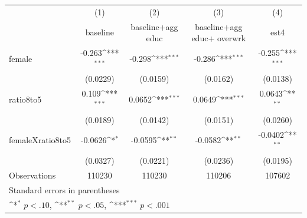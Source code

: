 {
\def\sym#1{\ifmmode^{#1}\else\(^{#1}\)\fi}
\begin{tabular}{l*{4}{c}}
\hline\hline
                    &\multicolumn{1}{c}{(1)}&\multicolumn{1}{c}{(2)}&\multicolumn{1}{c}{(3)}&\multicolumn{1}{c}{(4)}\\
                    &\multicolumn{1}{c}{baseline }&\multicolumn{1}{c}{baseline+agg educ}&\multicolumn{1}{c}{baseline+agg educ+ overwrk}&\multicolumn{1}{c}{est4}\\
\hline
female              &      -0.263\sym{***}&      -0.298\sym{***}&      -0.286\sym{***}&      -0.255\sym{***}\\
                    &    (0.0229)         &    (0.0159)         &    (0.0162)         &    (0.0138)         \\
[1em]
ratio8to5           &       0.109\sym{***}&      0.0652\sym{***}&      0.0649\sym{***}&      0.0643\sym{**} \\
                    &    (0.0189)         &    (0.0142)         &    (0.0151)         &    (0.0260)         \\
[1em]
femaleXratio8to5    &     -0.0626\sym{*}  &     -0.0595\sym{**} &     -0.0582\sym{**} &     -0.0402\sym{**} \\
                    &    (0.0327)         &    (0.0221)         &    (0.0236)         &    (0.0195)         \\
\hline
Observations        &      110230         &      110230         &      110206         &      107602         \\
\hline\hline
\multicolumn{5}{l}{\footnotesize Standard errors in parentheses}\\
\multicolumn{5}{l}{\footnotesize \sym{*} \(p<.10\), \sym{**} \(p<.05\), \sym{***} \(p<.001\)}\\
\end{tabular}
}
